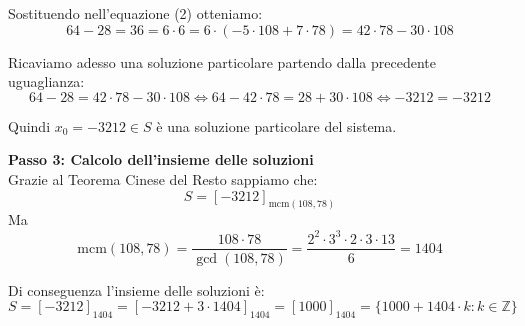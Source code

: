 \documentclass[12pt]{article}
\begin{document}
Sostituendo nell'equazione (2) otteniamo:
$$64 - 28 = 36 = 6 \cdot 6 = 6 \cdot (-5 \cdot 108 + 7 \cdot 78) = 42 \cdot 78 - 30 \cdot 108$$

Ricaviamo adesso una soluzione particolare partendo dalla precedente uguaglianza:
$$64 - 28 = 42 \cdot 78 - 30 \cdot 108 \iff 64 - 42 \cdot 78 = 28 + 30 \cdot 108 \iff -3212 = -3212$$

Quindi $x_0 = -3212 \in S$ è una soluzione particolare del sistema.


\textbf{Passo 3: Calcolo dell'insieme delle soluzioni} \\ 
Grazie al Teorema Cinese del Resto sappiamo che:
$$S = [-3212]_{\mathrm{mcm}(108, 78)}$$
Ma
$$\mathrm{mcm}({108}, {78}) = \frac{{108} \cdot {78}}{\gcd({108},{78})} = \frac{{2^{2} \cdot 3^{3}} \cdot {2 \cdot 3 \cdot 13}}{6} = {1404}$$

Di conseguenza l'insieme delle soluzioni è:
        $$S = [-3212]_{1404} = [-3212 + 3 \cdot 1404]_{1404} = [1000]_{1404} = \{1000 + 1404 \cdot k : k \in \mathbb{Z}\}$$
        
\end{document}
